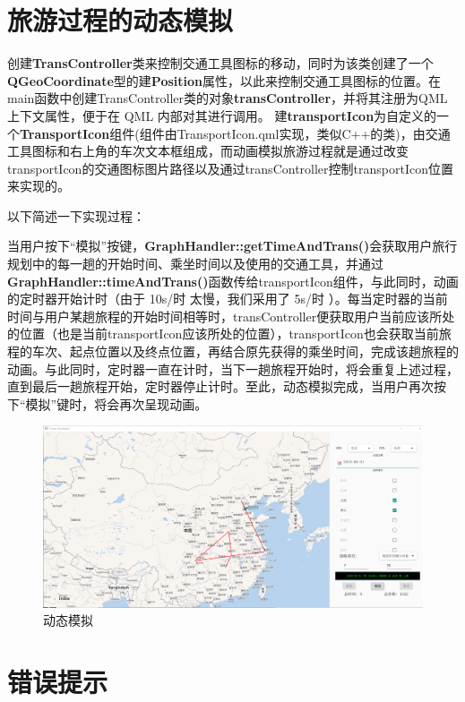 \documentclass[lang=cn,blue,13pt]{elegantbook}
\begin{document}
\section{旅游过程的动态模拟}

创建\textbf{TransController}类来控制交通工具图标的移动，同时为该类创建了一个\textbf{QGeoCoordinate}型的建\textbf{Position}属性，以此来控制交通工具图标的位置。在main函数中创建TransController类的对象\textbf{transController}，并将其注册为QML上下文属性，便于在 QML 内部对其进行调用。
建\textbf{transportIcon}为自定义的一个\textbf{TransportIcon}组件(组件由TransportIcon.qml实现，类似C++的类)，由交通工具图标和右上角的车次文本框组成，而动画模拟旅游过程就是通过改变transportIcon的交通图标图片路径以及通过transController控制transportIcon位置来实现的。

以下简述一下实现过程：

当用户按下“模拟”按键，\textbf{GraphHandler::getTimeAndTrans()}会获取用户旅行规划中的每一趟的开始时间、乘坐时间以及使用的交通工具，并通过\textbf{GraphHandler::timeAndTrans()}函数传给transportIcon组件，与此同时，动画的定时器开始计时（由于 10s/时 太慢，我们采用了 5s/时 ）。每当定时器的当前时间与用户某趟旅程的开始时间相等时，transController便获取用户当前应该所处的位置（也是当前transportIcon应该所处的位置），transportIcon也会获取当前旅程的车次、起点位置以及终点位置，再结合原先获得的乘坐时间，完成该趟旅程的动画。与此同时，定时器一直在计时，当下一趟旅程开始时，将会重复上述过程，直到最后一趟旅程开始，定时器停止计时。至此，动态模拟完成，当用户再次按下“模拟”键时，将会再次呈现动画。

\begin{figure}[!htbp]
	\centering
	\includegraphics[width=.9\textwidth]{sim.png}
	\caption{动态模拟}
	\label{sim}
\end{figure}

\section{错误提示}
\end{document}
